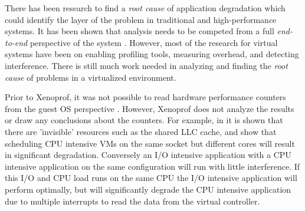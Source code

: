 \indent There has been research to find a \emph{root cause} of application degradation which could identify the layer of the problem in traditional \cite{traeger} and high-performance \cite{knapp1} systems.  It has been shown that analysis needs to be competed from a full \emph{end-to-end} perspective of the system \cite{saltzer, gupta1}.  However, most of the research for virtual systems have been on enabling profiling tools, measuring overhead, and detecting interference.  There is still much work needed in analyzing and finding the \emph{root cause} of problems in a virtualized environment.

\indent Prior to Xenoprof, it was not possible to read hardware performance counters from the guest OS perspective \cite{menon, du2}.  However, Xenoprof does not analyze the results or draw any conclusions about the counters.  For example, in \cite{tickoo} it is shown that there are 'invisible' resources such as the shared LLC cache, and show that scheduling CPU intensive VMs on the same socket but different cores will result in significant degradation.  Conversely an I/O intensive application with a CPU intensive application on the same configuration will run with little interference.  If this I/O and CPU load runs on the same CPU the I/O intensive application will perform optimally, but will significantly degrade the CPU intensive application due to multiple interrupts to read the data from the virtual controller.


